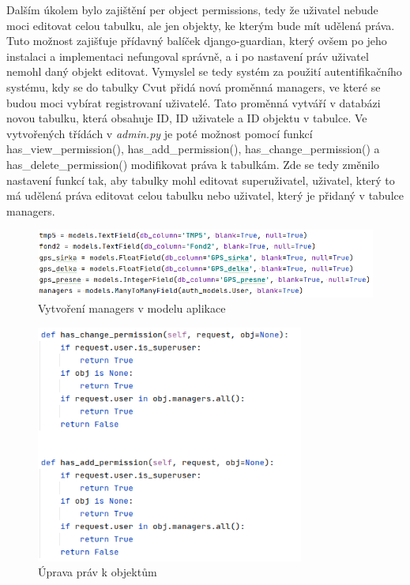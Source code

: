 Dalším úkolem bylo zajištění per object permissions, tedy že uživatel nebude moci editovat celou tabulku, ale jen objekty, ke kterým bude mít udělená práva. Tuto možnost zajišťuje přídavný balíček django-guardian, který ovšem po jeho instalaci a implementaci nefungoval správně, a i po nastavení práv uživatel nemohl daný objekt editovat. Vymyslel se tedy systém za použití autentifikačního systému, kdy se do tabulky Cvut přidá nová proměnná managers, ve které se budou moci vybírat registrovaní uživatelé. Tato proměnná vytváří v databázi novou tabulku, která obsahuje ID, ID uživatele a ID objektu v tabulce. Ve vytvořených třídách v \emph{admin.py} je poté možnost pomocí funkcí has\_view\_permission(), has\_add\_permission(), has\_change\_permission() a has\_delete\_permission() modifikovat práva k tabulkám. Zde se tedy změnilo nastavení funkcí tak, aby tabulky mohl editovat superuživatel, uživatel, který to má udělená práva editovat celou tabulku nebo uživatel, který je přidaný v tabulce managers. 

\begin{figure}[H] \centering
    \includegraphics[width=330pt]{./pictures/11-managers-model.PNG}
    \caption[Vytvoření managers v modelu aplikace]{Vytvoření managers v modelu aplikace}
	\label{fig:Vytvoření managers v modelu aplikace}              
\end{figure}

\begin{figure}[H] \centering
    \includegraphics[width=250pt]{./pictures/14-object-permissions.PNG}
    \caption[Úprava práv k objektům]{Úprava práv k objektům}
	\label{fig:Úprava práv k objektům}              
\end{figure}


